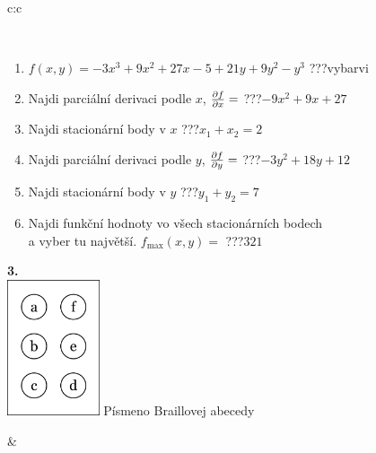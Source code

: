 \documentclass[10pt]{report}
\begin{document}
\begin{tabular}{c:c}
\begin{minipage}[c][104.5mm][t]{0.5\linewidth}
\begin{center}
\begin{minipage}{0.95\linewidth}
\begin{center}
\end{center}
\end{minipage}
\\[1mm]
\begin{minipage}{0.79\linewidth}
\begin{center}
\begin{varwidth}{\linewidth}
\begin{enumerate}
\normalsize
\item $f(x,y)=-3x^3+9x^2+27x-5+21y+9y^2-y^3$\quad \dotfill\; ???\;\dotfill \quad vybarvi
\item Najdi parciální derivaci podle $x$, $\pdv{f}{x}=$\quad \dotfill\; ???\;\dotfill \quad $-9x^2+9x+27$
\item Najdi stacionární body v $x$\quad \dotfill\; ???\;\dotfill \quad $x_1+x_2=2$
\item Najdi parciální derivaci podle $y$, $\pdv{f}{y}=$\quad \dotfill\; ???\;\dotfill \quad $-3y^2+18y+12$
\item Najdi stacionární body v $y$\quad \dotfill\; ???\;\dotfill \quad $y_1+y_2=7$
\item Najdi funkční hodnoty vo všech stacionárních bodech \\ \phantom{xxxxxx} a vyber tu najvětší. $f_{\text{max}}(x,y)=$\quad \dotfill\; ???\;\dotfill \quad $321$
\end{enumerate}
\end{varwidth}
\end{center}
\end{minipage}
\begin{minipage}{0.20\linewidth}
\begin{center}
{\Huge\bfseries 3.} \\[2mm]
\includegraphics[height=40mm]{../images/braille.png}
{\small Písmeno Braillovej abecedy}
\end{center}
\end{minipage}
\end{center}
\end{minipage}
&
\begin{minipage}[c][104.5mm][t]{0.5\linewidth}
\begin{center}

\end{center}
\end{minipage}
\end{tabular}
\end{document}
